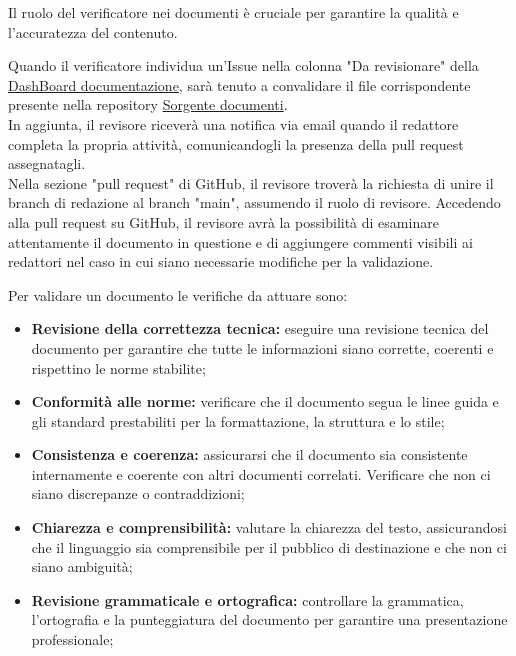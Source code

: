 Il ruolo del verificatore nei documenti è cruciale per garantire la qualità e l'accuratezza del contenuto.

Quando il verificatore individua un'Issue nella colonna "Da revisionare" della \href{https://github.com/orgs/ByteOps-swe/projects/1/views/1}{DashBoard documentazione}, sarà tenuto a convalidare il file corrispondente presente nella repository \href{https://github.com/ByteOps-swe/Sorgente-documenti}{Sorgente documenti}. \\
In aggiunta, il revisore riceverà una notifica via email quando il redattore completa la propria attività, comunicandogli la presenza della pull request assegnatagli.\\
Nella sezione "pull request" di GitHub, il revisore troverà la richiesta di unire il branch di redazione al branch "main", assumendo il ruolo di revisore. Accedendo alla pull request su GitHub, il revisore avrà la possibilità di esaminare attentamente il documento in questione e di aggiungere commenti visibili ai redattori nel caso in cui siano necessarie modifiche per la validazione.

\vspace{0.3cm}

Per validare un documento le verifiche da attuare sono:
\begin{itemize}
    \item \textbf{Revisione della correttezza tecnica:} 
        eseguire una revisione tecnica del documento per garantire che tutte le informazioni siano corrette, coerenti e rispettino le norme stabilite;
    \item \textbf{Conformità alle norme:} 
        verificare che il documento segua le linee guida e gli standard prestabiliti per la formattazione, la struttura e lo stile;
    \item \textbf{Consistenza e coerenza:} 
        assicurarsi che il documento sia consistente internamente e coerente con altri documenti correlati. Verificare che non ci siano discrepanze o contraddizioni;
    \item \textbf{Chiarezza e comprensibilità:} 
        valutare la chiarezza del testo, assicurandosi che il linguaggio sia comprensibile per il pubblico di destinazione e che non ci siano ambiguità;
    \item \textbf{Revisione grammaticale e ortografica:} 
        controllare la grammatica, l'ortografia e la punteggiatura del documento per garantire una presentazione professionale;
\end{itemize}

